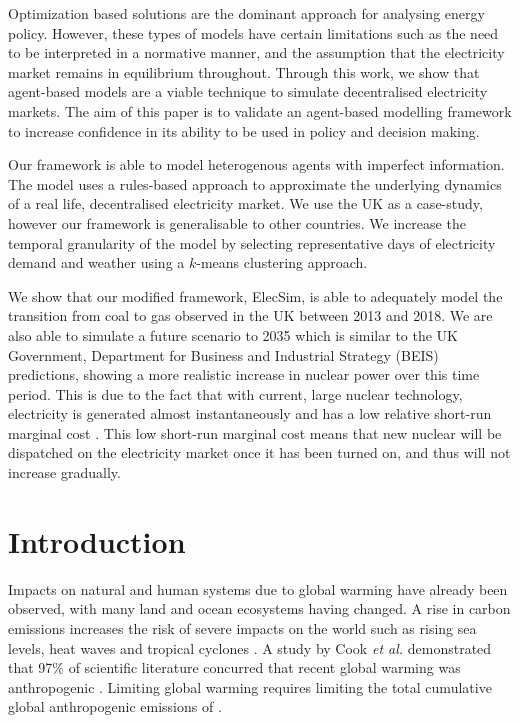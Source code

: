 Optimization based solutions are the dominant approach for analysing energy policy. However, these types of models have certain limitations such as the need to be interpreted in a normative manner, and the assumption that the electricity market remains in equilibrium throughout. Through this work, we show that agent-based models are a viable technique to simulate decentralised electricity markets. The aim of this paper is to validate an agent-based modelling framework to increase confidence in its ability to be used in policy and decision making. 



Our framework is able to model heterogenous agents with imperfect information. The model uses a rules-based approach to approximate the underlying dynamics of a real life, decentralised electricity market. We use the UK as a case-study, however our framework is generalisable to other countries. We increase the temporal granularity of the model by selecting representative days of electricity demand and weather using a $k$-means clustering approach. 




We show that our modified framework, ElecSim, is able to adequately model the transition from coal to gas observed in the UK between 2013 and 2018. We are also able to simulate a future scenario to 2035 which is similar to the UK Government, Department for Business and Industrial Strategy (BEIS) predictions, showing a more realistic increase in nuclear power over this time period. This is due to the fact that with current, large nuclear technology, electricity is generated almost instantaneously and has a low relative short-run marginal cost \cite{Department2016}. This low short-run marginal cost means that new nuclear will be dispatched on the electricity market once it has been turned on, and thus will not increase gradually.

\section{Introduction}


Impacts on natural and human systems due to global warming have already been observed, with many land and ocean ecosystems having changed. A rise in carbon emissions increases the risk of severe impacts on the world such as rising sea levels, heat waves and tropical cyclones \cite{Masson-Delmotte2018}. A study by Cook \textit{et al.} demonstrated that 97\% of scientific literature concurred that recent global warming was anthropogenic \cite{Cook2013}. Limiting global warming requires limiting the total cumulative global anthropogenic emissions of   \cite{Masson-Delmotte2018}. 

